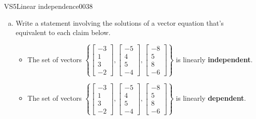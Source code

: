 \begin{exercise}{VS5}{Linear independence}{0038} 
\begin{exerciseStatement} 

\begin{enumerate}[(a)]
\item  

 Write a statement involving the solutions of a vector equation that's equivalent to each claim below. 

 

\begin{itemize}
\item  

 The set of vectors \(\left\{ \left[\begin{array}{c}
-3 \\
1 \\
3 \\
-2
\end{array}\right] , \left[\begin{array}{c}
-5 \\
4 \\
5 \\
-4
\end{array}\right] , \left[\begin{array}{c}
-8 \\
5 \\
8 \\
-6
\end{array}\right] \right\}\) is linearly \textbf{independent}. 

 
\item  

 The set of vectors \(\left\{ \left[\begin{array}{c}
-3 \\
1 \\
3 \\
-2
\end{array}\right] , \left[\begin{array}{c}
-5 \\
4 \\
5 \\
-4
\end{array}\right] , \left[\begin{array}{c}
-8 \\
5 \\
8 \\
-6
\end{array}\right] \right\}\) is linearly \textbf{dependent}. 

 
\end{itemize}


\end{enumerate}
\end{exerciseStatement}
\end{exercise}
